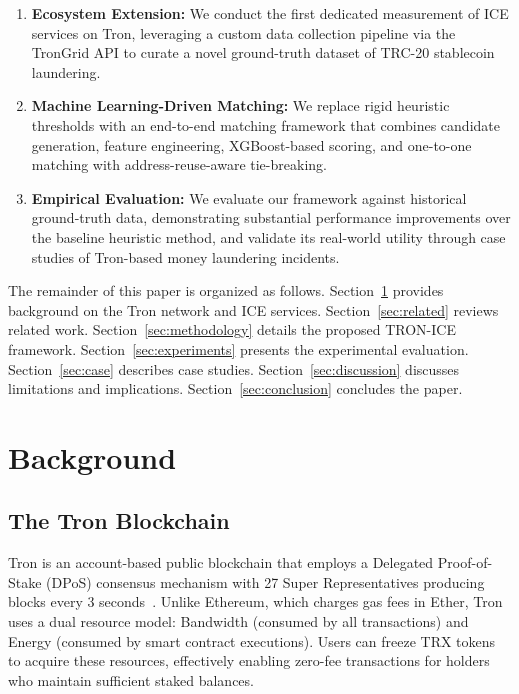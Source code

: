 \documentclass[journal]{IEEEtran}
\begin{document}
    \begin{enumerate}
    \item \textbf{Ecosystem Extension:} We conduct the first dedicated measurement of ICE services on Tron, leveraging a custom data collection pipeline via the TronGrid API to curate a novel ground-truth dataset of TRC-20 stablecoin laundering.
    \item \textbf{Machine Learning-Driven Matching:} We replace rigid heuristic thresholds with an end-to-end matching framework that combines candidate generation, feature engineering, XGBoost-based scoring, and one-to-one matching with address-reuse-aware tie-breaking.
    \item \textbf{Empirical Evaluation:} We evaluate our framework against historical ground-truth data, demonstrating substantial performance improvements over the baseline heuristic method, and validate its real-world utility through case studies of Tron-based money laundering incidents.
    \end{enumerate}
    
    The remainder of this paper is organized as follows. Section~\ref{sec:background} provides background on the Tron network and ICE services. Section~\ref{sec:related} reviews related work. Section~\ref{sec:methodology} details the proposed TRON-ICE framework. Section~\ref{sec:experiments} presents the experimental evaluation. Section~\ref{sec:case} describes case studies. Section~\ref{sec:discussion} discusses limitations and implications. Section~\ref{sec:conclusion} concludes the paper.
    
    \section{Background}
    \label{sec:background}
    
    \subsection{The Tron Blockchain}
    
    Tron is an account-based public blockchain that employs a Delegated Proof-of-Stake (DPoS) consensus mechanism with 27 Super Representatives producing blocks every 3 seconds~\cite{tron2024}. Unlike Ethereum, which charges gas fees in Ether, Tron uses a dual resource model: Bandwidth (consumed by all transactions) and Energy (consumed by smart contract executions). Users can freeze TRX tokens to acquire these resources, effectively enabling zero-fee transactions for holders who maintain sufficient staked balances.
    
\end{document}

